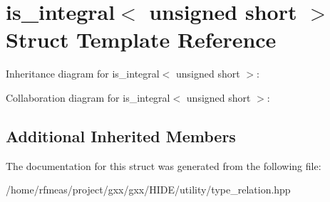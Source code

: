 \hypertarget{structis__integral_3_01unsigned_01short_01_4}{}\section{is\+\_\+integral$<$ unsigned short $>$ Struct Template Reference}
\label{structis__integral_3_01unsigned_01short_01_4}


Inheritance diagram for is\+\_\+integral$<$ unsigned short $>$\+:


Collaboration diagram for is\+\_\+integral$<$ unsigned short $>$\+:
\subsection*{Additional Inherited Members}


The documentation for this struct was generated from the following file\+:\begin{DoxyCompactItemize}
\item 
/home/rfmeas/project/gxx/gxx/\+H\+I\+D\+E/utility/type\+\_\+relation.\+hpp\end{DoxyCompactItemize}
